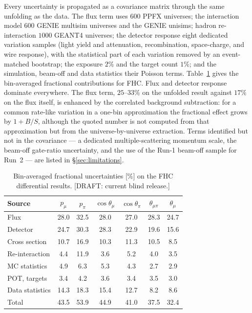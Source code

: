 \documentclass[aps,prd,twocolumn,superscriptaddress,nofootinbib,floatfix]{revtex4-2}
\begin{document}
Every uncertainty is propagated as a covariance matrix through the same unfolding as the data.
The flux term uses $600$ PPFX universes; the interaction model $600$ GENIE multisim universes and
the GENIE unisims; hadron re-interaction $1000$ GEANT4 universes; the detector response eight
dedicated variation samples (light yield and attenuation, recombination, space-charge, and wire
response), with the statistical part of each variation removed by an event-matched bootstrap; the
exposure $2\%$ and the target count $1\%$; and the simulation, beam-off and data statistics their
Poisson terms. Table~\ref{tab:syst} gives the bin-averaged fractional contributions for FHC. Flux
and detector response dominate everywhere. The flux term, $25$--$33\%$ on the unfolded result
against $17\%$ on the flux itself, is enhanced by the correlated background subtraction: for a
common rate-like variation in a one-bin approximation the fractional effect grows by $1+B/S$,
although the quoted number is not computed from that approximation but from the universe-by-universe
extraction. Terms identified but not in the covariance --- a dedicated multiple-scattering momentum
scale, the beam-off gate-ratio uncertainty, and the use of the Run-1 beam-off sample for Run~2 ---
are listed in \S\ref{sec:limitations}.

\begin{table}[t]
  \caption{Bin-averaged fractional uncertainties [\%] on the FHC differential results.
    [DRAFT: current blind release.]}
  \label{tab:syst}
  \begin{ruledtabular}
  \begin{tabular}{lcccccc}
    Source & $p_\mu$ & $p_\pi$ & $\cos\theta_\mu$ & $\cos\theta_\pi$ & $\theta_{\mu\pi}$ & $\theta_\mu$ \\
    \hline
    Flux & 28.0 & 32.5 & 28.0 & 27.0 & 28.3 & 24.7 \\
    Detector & 24.7 & 30.3 & 28.3 & 22.9 & 19.6 & 15.6 \\
    Cross section & 10.7 & 16.9 & 10.3 & 11.3 & 10.5 & 8.5 \\
    Re-interaction & 4.4 & 11.9 & 3.6 & 5.2 & 4.0 & 3.5 \\
    MC statistics & 4.9 & 6.3 & 5.3 & 4.3 & 2.7 & 2.9 \\
    POT, targets & 3.4 & 4.2 & 3.6 & 3.4 & 3.5 & 3.0 \\
    Data statistics & 14.3 & 18.3 & 15.4 & 12.7 & 8.2 & 8.6 \\
    \hline
    Total & 43.5 & 53.9 & 44.9 & 41.0 & 37.5 & 32.4 \\
  \end{tabular}
  \end{ruledtabular}
\end{table}
\end{document}

